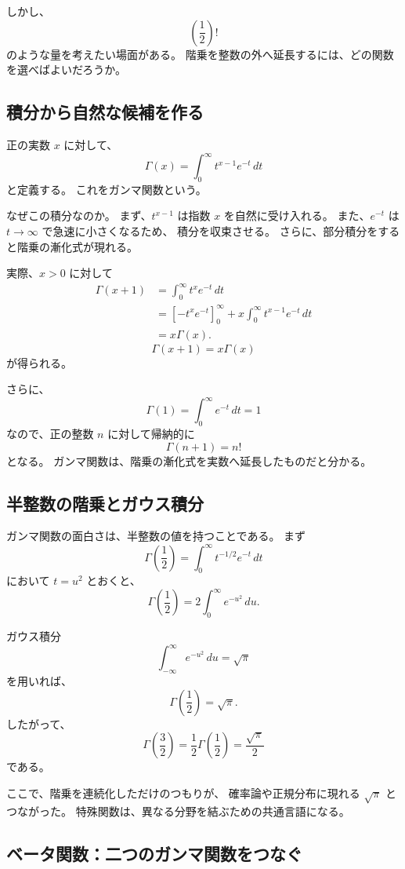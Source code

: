 しかし、
\[
  \left(\frac12\right)!
\]
のような量を考えたい場面がある。
階乗を整数の外へ延長するには、どの関数を選べばよいだろうか。

\subsection{積分から自然な候補を作る}

正の実数 $x$ に対して、
\[
  \Gamma(x)=\int_0^\infty t^{x-1}e^{-t}\,dt
\]
と定義する。
これをガンマ関数という。

なぜこの積分なのか。
まず、$t^{x-1}$ は指数 $x$ を自然に受け入れる。
また、$e^{-t}$ は $t\to\infty$ で急速に小さくなるため、
積分を収束させる。
さらに、部分積分をすると階乗の漸化式が現れる。

実際、$x>0$ に対して
\[
\begin{aligned}
  \Gamma(x+1)
  &=\int_0^\infty t^x e^{-t}\,dt\\
  &=\left[-t^xe^{-t}\right]_0^\infty
    +x\int_0^\infty t^{x-1}e^{-t}\,dt\\
  &=x\Gamma(x).
\end{aligned}
\]
\[
  \boxed{\Gamma(x+1)=x\Gamma(x)}
\]
が得られる。

さらに、
\[
  \Gamma(1)=\int_0^\infty e^{-t}\,dt=1
\]
なので、正の整数 $n$ に対して帰納的に
\[
  \Gamma(n+1)=n!
\]
となる。
ガンマ関数は、階乗の漸化式を実数へ延長したものだと分かる。

\subsection{半整数の階乗とガウス積分}

ガンマ関数の面白さは、半整数の値を持つことである。
まず
\[
  \Gamma\left(\frac12\right)
  =\int_0^\infty t^{-1/2}e^{-t}\,dt
\]
において $t=u^2$ とおくと、
\[
  \Gamma\left(\frac12\right)
  =2\int_0^\infty e^{-u^2}\,du.
\]

ガウス積分
\[
  \int_{-\infty}^{\infty}e^{-u^2}\,du=\sqrt{\pi}
\]
を用いれば、
\[
  \Gamma\left(\frac12\right)=\sqrt{\pi}.
\]
したがって、
\[
  \Gamma\left(\frac32\right)
  =\frac12\Gamma\left(\frac12\right)
  =\frac{\sqrt{\pi}}2
\]
である。

ここで、階乗を連続化しただけのつもりが、
確率論や正規分布に現れる $\sqrt{\pi}$ とつながった。
特殊関数は、異なる分野を結ぶための共通言語になる。

\subsection{ベータ関数：二つのガンマ関数をつなぐ}

